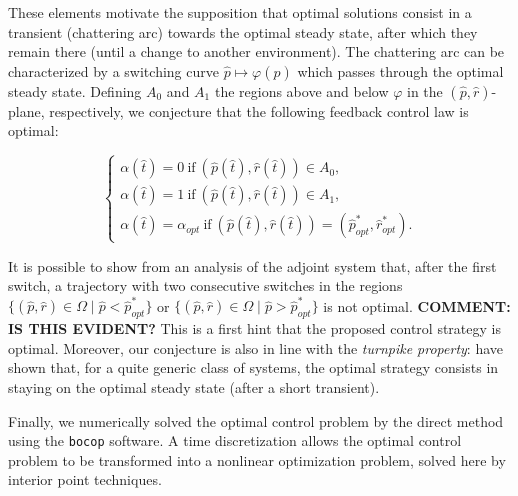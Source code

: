 These elements motivate the supposition that optimal solutions consist in a transient (chattering arc) towards the optimal steady state, after which they remain there (until a change to another environment). The chattering arc can be characterized by a switching curve $\hat{p}\mapsto\varphi(\hat{p})$ which passes through the optimal steady state.
Defining $A_0$ and $A_1$ the regions above and below $\varphi$ in the $(\hat{p},\hat{r})$-plane, respectively, we conjecture that the following feedback control law is optimal: 


\begin{equation}\label{control-opt}
\begin{cases}
\alpha(\hat{t})=0 \ \textrm{if} \ (\hat{p}(\hat{t}),\hat{r}(\hat{t}))\in A_0,\\
\alpha(\hat{t})=1 \ \textrm{if} \ (\hat{p}(\hat{t}),\hat{r}(\hat{t}))\in A_1,\\
\alpha(\hat{t})=\alpha_{opt} \ \textrm{if} \ (\hat{p}(\hat{t}),\hat{r}(\hat{t}))=(\hat{p}_{opt}^*,\hat{r}_{opt}^*).
\end{cases}
\end{equation}

It is possible to show from an analysis of the adjoint system that, after the first switch, a trajectory with two consecutive switches in the regions $\{(\hat{p},\hat{r})\in \Omega \mid \hat{p}<\hat{p}_{opt}^*\}$ or $\{(\hat{p},\hat{r})\in \Omega \mid \hat{p}>\hat{p}_{opt}^*\}$ is not optimal. \textbf{COMMENT: IS THIS EVIDENT?} This is a first hint that the proposed control strategy is optimal. Moreover, our conjecture is also in line with the \textit{turnpike property}: \cite{trelat_turnpike_2015} have shown that, for a quite generic class of systems, the optimal strategy consists in staying on the optimal steady state (after a short transient).

Finally, we numerically solved the optimal control problem by the direct method using the \texttt{bocop} software\cite{bonnans_bocop_2012}. A time discretization allows the optimal control problem to be transformed into a nonlinear optimization problem,
solved here by interior point techniques.

